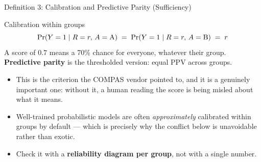 
\begin{frame}{Definition 3: Calibration and Predictive Parity (Sufficiency)}

    \begin{block}{Calibration within groups}
        \[
            \Pr(Y = 1 \mid R = r,\, A = \text{A}) \;=\; \Pr(Y = 1 \mid R = r,\, A = \text{B}) \;=\; r
        \]
        A score of $0.7$ means a 70\% chance for everyone, whatever their group.
        \textbf{Predictive parity} is the thresholded version: equal PPV across groups.
    \end{block}

    \vspace{0.8em}

    \begin{itemize}
        \setlength\itemsep{0.45em}
        \item This is the criterion the COMPAS vendor pointed to, and it is a genuinely important
              one: without it, a human reading the score is being misled about what it means.
        \item Well-trained probabilistic models are often \emph{approximately} calibrated
              within groups by default --- which is precisely why the conflict below is unavoidable
              rather than exotic.
        \item Check it with a \textbf{reliability diagram per group}, not with a single number.
    \end{itemize}
\end{frame}
